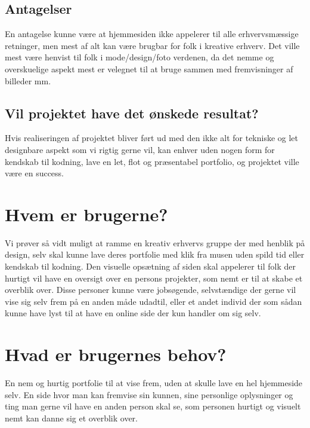 \documentclass[a4paper,titlepage,fleqn,12pt]{article}
\begin{document}
\subsection{Antagelser}
En antagelse kunne være at hjemmesiden ikke appelerer til alle erhvervsmæssige retninger, men mest af alt kan være brugbar for folk i kreative erhverv. Det ville mest være henvist til folk i mode/design/foto verdenen, da det nemme og overskuelige aspekt mest er velegnet til at bruge sammen med fremvisninger af billeder mm.

\subsection{Vil projektet have det ønskede resultat?}
Hvis realiseringen af projektet bliver ført ud med den ikke alt for tekniske og let designbare aspekt som vi rigtig gerne vil, kan enhver uden nogen form for kendskab til kodning, lave en let, flot og præsentabel portfolio, og projektet ville være en success.

\section{Hvem er brugerne?}
Vi prøver så vidt muligt at ramme en kreativ erhvervs gruppe der med henblik på design, selv skal kunne lave deres portfolie med klik fra musen uden spild tid eller kendskab til kodning. Den visuelle opsætning af siden skal appelerer til folk der hurtigt vil have en oversigt over en persons projekter, som nemt er til at skabe et overblik over. Disse personer kunne være jobsøgende, selvstændige der gerne vil vise sig selv frem på en anden måde udadtil, eller et andet individ der som sådan kunne have lyst til at have en online side der kun handler om sig selv.

\section{Hvad er brugernes behov?}
En nem og hurtig portfolie til at vise frem, uden at skulle lave en hel hjemmeside selv. En side hvor man kan fremvise sin kunnen, sine personlige oplysninger og ting man gerne vil have en anden person skal se, som personen hurtigt og visuelt nemt kan danne sig et overblik over.
\end{document}
